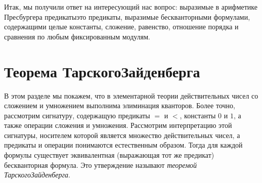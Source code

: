 Итак, мы получили ответ на интересующий нас вопрос: выразимые в
арифметике Пресбургера предикаты\т это предикаты, выразимые
бескванторными формулами, содержащими целые константы, сложение,
равенство, отношение порядка и сравнения по любым фиксированным
модулям.

\section{Теорема Тарского\texorpdfstring{\ч}{--}Зайденберга}
        \label{seidenberg-tarski}%

В этом разделе мы покажем, что в элементарной теории
действительных чисел со сложением и умножением
выполнима элиминация
кванторов. Более точно, рассмотрим сигнатуру, содержащую
предикаты $=$ и $<$, константы $0$ и $1$, а также операции
сложения и умножения. Рассмотрим интерпретацию этой сигнатуры,
носителем которой является множество действительных чисел, а
предикаты и операции понимаются естественным образом. Тогда для
каждой формулы существует эквивалентная (выражающая тот же
предикат) бескванторная формула. Это утверждение называют
\emph{теоремой Тарского\ч Зайденберга}.%

